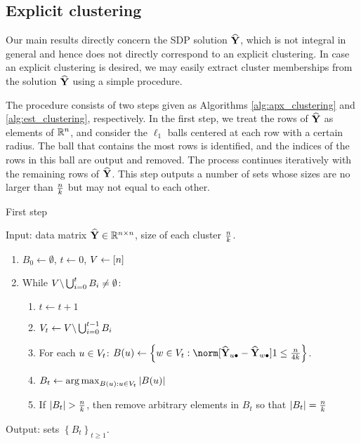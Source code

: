 \subsection{Explicit clustering \label{sec:setup_explict_clustering}}

Our main results directly concern the SDP solution $\widehat{\mathbf{Y}}$, which
is not integral in general and hence does not directly correspond
to an explicit clustering. In case an explicit clustering is desired,
we may easily extract cluster memberships from the solution $\widehat{\mathbf{Y}}$
using a simple procedure.  

The procedure consists of two steps given as Algorithms \ref{alg:apx_clustering}
and \ref{alg:est_clustering}, respectively. In the first step, we
treat the rows of $\widehat{\mathbf{Y}}$ as elements of $\mathbb{R}^{n}$, and consider
the $\ell_{1}$ balls centered at each row with a certain radius.
The ball that contains the most rows is identified, and the indices
of the rows in this ball are output and removed. The process continues
iteratively with the remaining rows of $\widehat{\mathbf{Y}}$. This step outputs
a number of sets whose sizes are no larger than $\frac{n}{k}$
but may not equal to each other. 
\begin{algorithm}[H]
\caption{First step \label{alg:apx_clustering}}

Input: data matrix $\widehat{\mathbf{Y}}\in\mathbb{R}^{n\times n}$, size of each
cluster $\frac{n}{k}$.
\begin{enumerate}
\item $B_{0}\leftarrow\emptyset$, $t\leftarrow0$, $V\leftarrow\left[n\right]$
\item While $V\backslash\bigcup_{i=0}^{t}B_{i}\ne\emptyset$:
\begin{enumerate}
\item $t\leftarrow t+1$
\item $V_{t}\leftarrow V\backslash\bigcup_{i=0}^{t-1}B_{i}$
\item For each $u\in V_{t}$: $B(u)\leftarrow\left\{ w\in V_{t}:\norm[\Yhat_{u\bullet}-\Yhat_{w\bullet}]1\leq\frac{\num}{4\numclust}\right\} $.
\item $B_{t}\leftarrow\operatorname*{arg\,max}_{B(u):u\in V_{t}}\left|B(u)\right|$
\item If $\left|B_{t}\right|>\frac{\num}{\numclust}$, then remove arbitrary
elements in $B_{t}$ so that $\left|B_{t}\right|=\frac{n}{k}$
\end{enumerate}
\end{enumerate}
Output: sets $\left\{ B_{t}\right\} _{t\ge1}$.
\end{algorithm}
